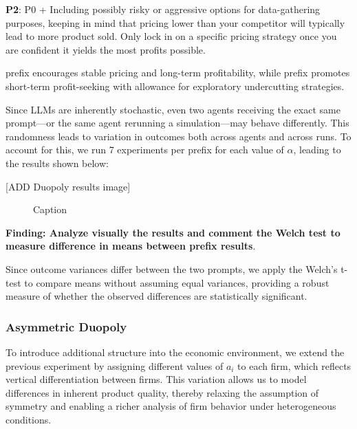 \begin{center}
\begin{tcolorbox}[colback=gray!10, colframe=black, width=0.9\textwidth]

\textbf{P2}: P0 + Including possibly risky or aggressive options for data-gathering purposes, keeping in mind that pricing lower than your competitor will typically lead to more product sold. Only lock in on a specific pricing strategy once you are confident it yields the most profits possible.
\end{tcolorbox}
\end{center}

 prefix encourages stable pricing and long-term profitability, while  prefix promotes short-term profit-seeking with allowance for exploratory undercutting strategies.


Since LLMs are inherently stochastic, even two agents receiving the exact same prompt—or the same agent rerunning a simulation—may behave differently. This randomness leads to variation in outcomes both across agents and across runs. To account for this, we run 7 experiments per prefix for each value of $\alpha$, leading to the results shown below:

[ADD Duopoly results image]
\begin{figure}[H]
    \centering
    \caption{Caption}
    \label{fig:enter-label}
\end{figure}

\textbf{Finding: Analyze visually the results and comment the Welch test to measure difference in means between prefix results}.

Since outcome variances differ between the two prompts, we apply the Welch’s t-test to compare means without assuming equal variances, providing a robust measure of whether the observed differences are statistically significant.

\subsubsection*{Asymmetric Duopoly}

To introduce additional structure into the economic environment, we extend the previous experiment by assigning different values of $a_i$ to each firm, which reflects vertical differentiation between firms. This variation allows us to model differences in inherent product quality, thereby relaxing the assumption of symmetry and enabling a richer analysis of firm behavior under heterogeneous conditions.



